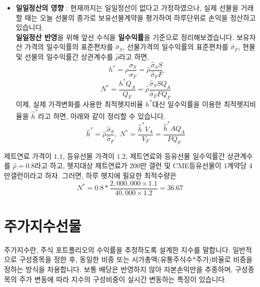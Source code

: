 \documentclass[
  letterpaper,
  DIV=11,
  numbers=noendperiod]{scrreprt}
\providecommand{\tightlist}{%
  \setlength{\itemsep}{0pt}\setlength{\parskip}{0pt}}\usepackage{longtable,booktabs,array}
\begin{document}
\begin{itemize}
\tightlist
\item
  \textbf{일일정산의 영향} : 현재까지는 일일정산이 없다고 가정하였으나,
  실제 선물을 거래할 때는 오늘 선물의 종가로 보유선물계약을 평가하여
  하루단위로 손익을 정산하고 있습니다.\\
  \textbf{일일정산 반영}을 위해 앞선 수식을 \textbf{일수익률}을 기준으로
  정리해보겠습니다. 보유자산 가격의 일수익률의 표준편차를
  \(\hat{\sigma}_S\), 선물가격의 일수익률의 표준편차를
  \(\hat{\sigma}_F\), 현물 및 선물의 일수익률간 상관계수를
  \(\hat{\rho}\)라고 하면,
  \[h^*=\rho \frac{\sigma _S}{\sigma _F}=\hat{\rho} \frac{\hat{\sigma} _S S}{\hat{\sigma} _F F}\]
  \[N^*=\frac{h^* Q_A}{Q_F}=\hat{\rho} \frac{\hat{\sigma} _S S Q_A}{\hat{\sigma} _F F Q_F}\]
  이제, 실제 가격변화를 사용한 최적헷지비율 \(h^*\)대신 일수익률을
  이용한 최적헷지비율을 \(\hat{h}^*\)라고 하면, 아래와 같이 정리할 수
  있습니다.
  \[\hat{h}^*=\hat{\rho} \frac{\hat{\sigma} _S}{\hat{\sigma} _F},\; N^*=\frac{\hat{h}^* V_A}{V_F}=\frac{\hat{h}^* A Q_A}{F Q_F}\]
\end{itemize}

\begin{tcolorbox}[enhanced jigsaw, toprule=.15mm, breakable, left=2mm, leftrule=.75mm, opacitybacktitle=0.6, coltitle=black, rightrule=.15mm, colback=white, titlerule=0mm, bottomtitle=1mm, colframe=quarto-callout-note-color-frame, title=\textcolor{quarto-callout-note-color}{\faInfo}\hspace{0.5em}{최적헷지비율 및 계약수 예시2}, toptitle=1mm, arc=.35mm, colbacktitle=quarto-callout-note-color!10!white, opacityback=0, bottomrule=.15mm]

제트연료 가격이 \(1.1\), 등유선물 가격이 \(1.2\), 제트연료와 등유선물
일수익률간 상관계수를 \(\hat{\rho} = 0.8\)라고 하고, 헷지대상 제트연료가
200만 갤런 및 CME등유선물이 1계약당 4만갤런이라고 하자. 그러면, 하루
헷지에 필요한 최적수량은
\[N^*=0.8*\frac{2,000,000 \times 1.1}{40,000 \times 1.2}=36.67\]

\end{tcolorbox}

\section*{주가지수선물}\label{uxc8fcuxac00uxc9c0uxc218uxc120uxbb3c}


주가지수란, 주식 포트폴리오의 수익률을 추정하도록 설계한 지수를
말합니다. 일반적으로 구성종목을 정한 후, 동일한 비중 또는
시가총액(유통주식수*주가)비율로 비중을 정하는 방식을 차용합니다. 보통
배당은 반영하지 않아 자본손익만을 추종하며, 구성종목의 주가 변동에 따라
지수의 구성비중이 실시간 변동하는 특징이 있습니다.
\end{document}
